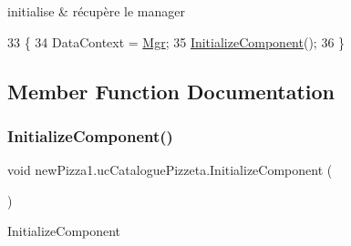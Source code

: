 initialise \& récupère le manager 


\begin{DoxyCode}
33         \{
34             DataContext = \hyperlink{classnewPizza1_1_1ucCataloguePizzeta_a272bf4809df4cc2080aca3c979521362}{Mgr};
35             \hyperlink{classnewPizza1_1_1ucCataloguePizzeta_afdbc12c0fdebf3e506da6fe56e30af7b}{InitializeComponent}();
36         \}
\end{DoxyCode}


\subsection{Member Function Documentation}
\mbox{\label{classnewPizza1_1_1ucCataloguePizzeta_afdbc12c0fdebf3e506da6fe56e30af7b}} 
\subsubsection{\texorpdfstring{Initialize\+Component()}{InitializeComponent()}\hspace{0.1cm}{\footnotesize\ttfamily [1/6]}}
{\footnotesize\ttfamily void new\+Pizza1.\+uc\+Catalogue\+Pizzeta.\+Initialize\+Component (\begin{DoxyParamCaption}{ }\end{DoxyParamCaption})\hspace{0.3cm}{\ttfamily [inline]}}



Initialize\+Component 


